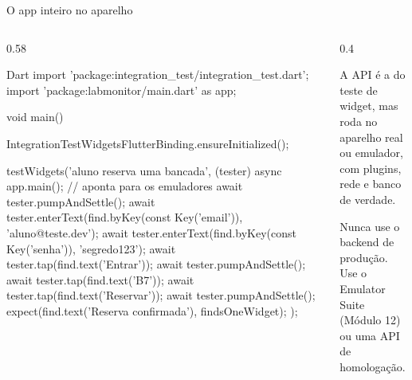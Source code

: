 \documentclass[aspectratio=169,10pt]{beamer}
\begin{document}
\begin{frame}[fragile]{O app inteiro no aparelho}
  \begin{columns}[T]
    \begin{column}{0.58\textwidth}
\begin{codigo}[title=integration\_test/reserva\_test.dart]{Dart}
import 'package:integration_test/integration_test.dart';
import 'package:labmonitor/main.dart' as app;

void main() {
  IntegrationTestWidgetsFlutterBinding.ensureInitialized();

  testWidgets('aluno reserva uma bancada', (tester) async {
    app.main();                 // aponta para os emuladores
    await tester.pumpAndSettle();
    await tester.enterText(find.byKey(const Key('email')),
        'aluno@teste.dev');
    await tester.enterText(find.byKey(const Key('senha')),
        'segredo123');
    await tester.tap(find.text('Entrar'));
    await tester.pumpAndSettle();
    await tester.tap(find.text('B7'));
    await tester.tap(find.text('Reservar'));
    await tester.pumpAndSettle();
    expect(find.text('Reserva confirmada'), findsOneWidget);
  });
}
\end{codigo}
    \end{column}
    \begin{column}{0.4\textwidth}
      \begin{conceito}
        A API é a do teste de widget, mas roda no aparelho real ou emulador, com plugins, rede e banco de verdade.
      \end{conceito}
      \begin{atencao}
        Nunca use o backend de produção. Use o Emulator Suite (Módulo 12) ou uma API de homologação.
      \end{atencao}
    \end{column}
  \end{columns}
\end{frame}
\end{document}

